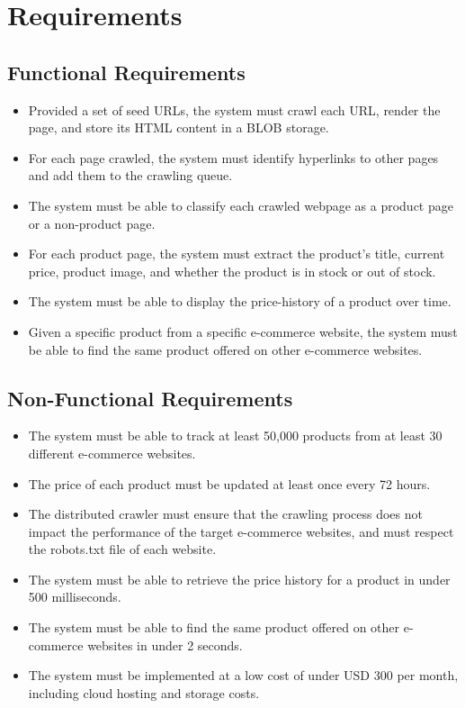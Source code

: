 \section{Requirements}\label{sec:requirements}

\subsection{Functional Requirements}\label{subsec:functional-requirements}

\begin{itemize}
    \item Provided a set of seed URLs, the system must crawl each URL, render the page, and store its HTML content in a BLOB storage.
    \item For each page crawled, the system must identify hyperlinks to other pages and add them to the crawling queue.
    \item The system must be able to classify each crawled webpage as a product page or a non-product page.
    \item For each product page, the system must extract the product's title, current price, product image, and whether the product is in stock or out of stock.
    \item The system must be able to display the price-history of a product over time.
    \item Given a specific product from a specific e-commerce website, the system must be able to find the same product offered on other e-commerce websites.
\end{itemize}

\subsection{Non-Functional Requirements}\label{subsec:non-functional-requirements}

\begin{itemize}
    \item The system must be able to track at least 50,000 products from at least 30 different e-commerce websites.
    \item The price of each product must be updated at least once every 72 hours.
    \item The distributed crawler must ensure that the crawling process does not impact the performance of the target e-commerce websites, and must respect the robots.txt file of each website.
    \item The system must be able to retrieve the price history for a product in under 500 milliseconds.
    \item The system must be able to find the same product offered on other e-commerce websites in under 2 seconds.
    \item The system must be implemented at a low cost of under USD 300 per month, including cloud hosting and storage costs.
\end{itemize}